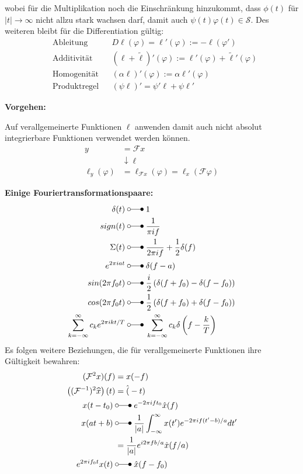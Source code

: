wobei für die Multiplikation noch die Einschränkung hinzukommt, dass $\phi(t)$ für $|t| \rightarrow \infty$ nicht allzu stark wachsen darf, damit auch $\psi(t)\varphi(t) \in \mathcal{S} $. 
Des weiteren bleibt für die Differentiation gültig:
\begin{align*}
    &\text{Ableitung}&& D\ell(\varphi)=\ell'(\varphi):=-\ell(\varphi') \\
    &\text{Additivität}&& (\ell+\tilde{\ell})'(\varphi):=\ell'(\varphi)+\widetilde{\ell}'(\varphi) \\
    &\text{Homogenität}&& (\alpha\ell)'(\varphi):=\alpha\ell'(\varphi) \\
    &\text{Produktregel}&& (\psi\ell)'=\psi'\ell+\psi\ell'
\end{align*}

\textbf{Vorgehen:}

Auf verallgemeinerte Funktionen $\ell$ anwenden damit auch nicht absolut integrierbare Funktionen verwendet werden können.
\begin{align*}
    y&=\mathcal{F}x \\
    &\downarrow \ell \\
    \ell_y(\varphi)&=\ell_{\mathcal{F}x}(\varphi)=\ell_x(\mathcal{F}\varphi)
\end{align*} 

\textbf{Einige Fouriertransformationspaare:}
\begin{align*}
    \delta(t) \;&\laplace\; 1 \\
    sign(t) \;&\laplace\; \frac{1}{\pi if} \\
    \Sigma(t) \;&\laplace\; \frac{1}{2\pi if}+\frac{1}{2}\delta(f) \\
    e^{2\pi iat} \;&\laplace\; \delta(f-a) \\
    sin(2\pi f_0t) \;&\laplace\; \frac{i}{2}\left(\delta(f+f_0)-\delta(f-f_0)\right) \\
    cos(2\pi f_0t) \;&\laplace\; \frac{1}{2}\left(\delta(f+f_0)+\delta(f-f_0)\right) \\
    \sum_{k=-\infty}^\infty c_ke^{2\pi ikt/T} \;&\laplace\; \sum_{k=-\infty}^\infty c_k\delta\left(f-\frac kT\right)
\end{align*}
Es folgen weitere Beziehungen, die für verallgemeinerte Funktionen ihre Gültigkeit bewahren:
\begin{align*}
    (\mathcal{F}^2x)(f) &= x(-f) \\
    \left((\mathcal{F}^{-1})^2\widehat{x}\right)(t) &= \hat(-t) \\
    x(t-t_{0}) \;&\laplace\; e^{-2\pi ift_0}\hat{x}(f) \\
    x(at+b) \;&\laplace\; \frac{1}{|a|}\int_{-\infty}^{\infty}x(t')e^{-2\pi if(t'-b)/a}dt'\\
    &=\frac1{|a|}e^{i2\pi fb/a}\hat{x}(f/a) \\
    e^{2\pi if_{0}t}x(t) \;&\laplace\; \hat{x}(f-f_0)
\end{align*}

